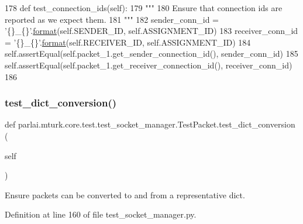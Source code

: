 \begin{DoxyCode}
178     \textcolor{keyword}{def }test\_connection\_ids(self):
179         \textcolor{stringliteral}{"""}
180 \textcolor{stringliteral}{        Ensure that connection ids are reported as we expect them.}
181 \textcolor{stringliteral}{        """}
182         sender\_conn\_id = \textcolor{stringliteral}{'\{\}\_\{\}'}.\hyperlink{namespaceparlai_1_1chat__service_1_1services_1_1messenger_1_1shared__utils_a32e2e2022b824fbaf80c747160b52a76}{format}(self.SENDER\_ID, self.ASSIGNMENT\_ID)
183         receiver\_conn\_id = \textcolor{stringliteral}{'\{\}\_\{\}'}.\hyperlink{namespaceparlai_1_1chat__service_1_1services_1_1messenger_1_1shared__utils_a32e2e2022b824fbaf80c747160b52a76}{format}(self.RECEIVER\_ID, self.ASSIGNMENT\_ID)
184         self.assertEqual(self.packet\_1.get\_sender\_connection\_id(), sender\_conn\_id)
185         self.assertEqual(self.packet\_1.get\_receiver\_connection\_id(), receiver\_conn\_id)
186 
\end{DoxyCode}
\mbox{\label{classparlai_1_1mturk_1_1core_1_1test_1_1test__socket__manager_1_1TestPacket_a49fabdabfedeeeb7f76a9a3ad513a954}} 
\subsubsection{\texorpdfstring{test\+\_\+dict\+\_\+conversion()}{test\_dict\_conversion()}}
{\footnotesize\ttfamily def parlai.\+mturk.\+core.\+test.\+test\+\_\+socket\+\_\+manager.\+Test\+Packet.\+test\+\_\+dict\+\_\+conversion (\begin{DoxyParamCaption}\item[{}]{self }\end{DoxyParamCaption})}

\begin{DoxyVerb}Ensure packets can be converted to and from a representative dict.
\end{DoxyVerb}
 

Definition at line 160 of file test\+\_\+socket\+\_\+manager.\+py.


